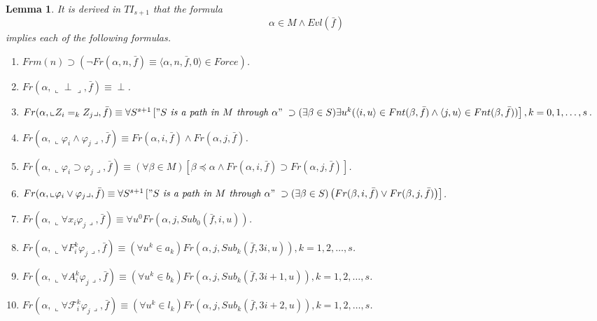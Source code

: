 \documentclass{asl}
\newtheorem{lemma}{Lemma}[section]
\theoremstyle{definition}
\begin{document}
\begin{lemma}
It is derived in $TI_{s+1}$ that the formula
\[\alpha\in M\wedge Evl(\bar{f})\]
implies each of the following formulas.
\begin{enumerate}
\item $Frm(n)\supset 
\left( \neg Fr(\alpha,n,\bar{f})\equiv \langle\alpha, n,\bar{f},0 \rangle \in Force\right) $.
\smallskip
\item $Fr(\alpha,\llcorner \perp \lrcorner,\bar{f})\equiv \perp$.
\medskip

\item 
$Fr(\alpha,\llcorner Z_i=_k Z_j \lrcorner,\bar{f}) \equiv 
\forall S^{s+1}\left["S\textit{ is a path in }M\textit{ through }\alpha" 
\right.
\medskip
\\
\left.
\supset(\exists\beta\in S)\exists u^k(\langle i,u\rangle\in Fnt(\beta,\bar{f})\wedge\langle j,u\rangle\in Fnt(\beta,\bar{f}))\right],
k=0,1,\ldots,s$.
\medskip

\item $Fr(\alpha,\llcorner \varphi_i \wedge \varphi_j \lrcorner,\bar{f}) \equiv Fr(\alpha,i,\bar{f})\wedge Fr(\alpha,j,\bar{f})$.
\medskip

\item $Fr(\alpha,\llcorner \varphi_i \supset \varphi_j \lrcorner,\bar{f}) \equiv 
(\forall\beta\in M)\left[\beta\preceq\alpha\wedge Fr(\alpha,i,\bar{f})\supset Fr(\alpha,j,\bar{f})\right]$.
\medskip

\item $Fr(\alpha,\llcorner \varphi_i \vee \varphi_j \lrcorner,\bar{f}) \equiv 
\forall S^{s+1}\left["S\textit{ is a path in }M\textit{ through }\alpha" 
\right.
\medskip
\\
\left.
\supset(\exists\beta\in S)\left(Fr(\beta,i,\bar{f})\vee Fr(\beta,j,\bar{f})\right) \right]$.
\medskip

\item $Fr(\alpha,\llcorner \forall x_i \varphi_j \lrcorner,\bar{f}) \equiv \forall u^0 Fr(\alpha,j,Sub_0(\bar{f},i,u))$.
\medskip

\item $Fr(\alpha,\llcorner \forall F_i^k \varphi_j \lrcorner,\bar{f}) \equiv (\forall u^k\in a_k) Fr(\alpha,j,Sub_k(\bar{f},3i,u)),k=1,2,\ldots,s$.
\medskip

\item $Fr(\alpha,\llcorner \forall A_i^k \varphi_j \lrcorner,\bar{f}) \equiv (\forall u^k\in b_k) Fr(\alpha,j,Sub_k(\bar{f},3i+1,u)),k=1,2,\ldots,s$.
\medskip

\item $Fr(\alpha,\llcorner \forall \mathcal{F}_i^k \varphi_j \lrcorner,\bar{f}) \equiv (\forall u^k\in l_k) Fr(\alpha,j,Sub_k(\bar{f},3i+2,u)),k=1,2,\ldots,s$.
\medskip


\end{enumerate}
\end{lemma}
\end{document}
